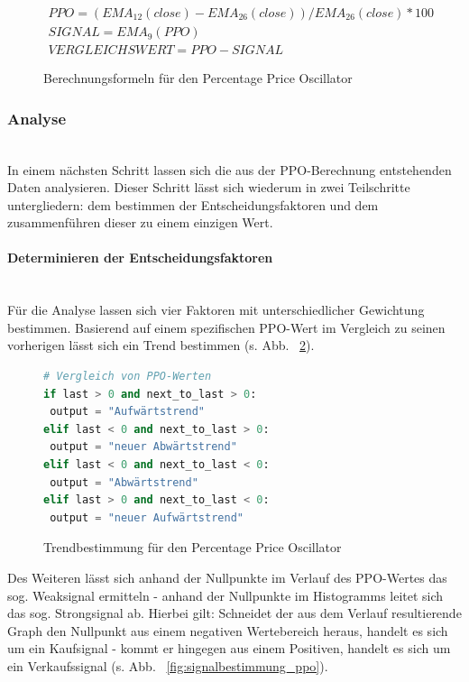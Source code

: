 \begin{figure}[!ht]
\begin{gather*} 
PPO = ( EMA_{12}(close) - EMA_{26}(close) ) / EMA_{26}(close) * 100 \\ 
SIGNAL =  EMA_9( PPO )\\
VERGLEICHSWERT = PPO - SIGNAL
\end{gather*}
\caption{Berechnungsformeln für den Percentage Price Oscillator \cite{tvWikiPpo}}
\label{fig:formular_ppo}
\end{figure}

\subsubsection{Analyse}~\\
\label{subsec_analysis_ppo}
In einem nächsten Schritt lassen sich die aus der PPO-Berechnung entstehenden Daten analysieren. Dieser Schritt lässt sich wiederum in zwei Teilschritte untergliedern: dem bestimmen der Entscheidungsfaktoren und dem zusammenführen dieser zu einem einzigen Wert.

\paragraph{Determinieren der Entscheidungsfaktoren}~\\
\label{subsubsec_analysis_calc_ppo}
Für die Analyse lassen sich vier Faktoren mit unterschiedlicher Gewichtung bestimmen. Basierend auf einem spezifischen PPO-Wert im Vergleich zu seinen vorherigen lässt sich ein Trend bestimmen (s. Abb. ~\ref{fig:trendbestimmung_ppo}).

\begin{figure}[!ht]
\begin{lstlisting}[language=Python]
# Vergleich von PPO-Werten
if last > 0 and next_to_last > 0:
 output = "Aufwärtstrend"
elif last < 0 and next_to_last > 0:
 output = "neuer Abwärtstrend"
elif last < 0 and next_to_last < 0:
 output = "Abwärtstrend"
elif last > 0 and next_to_last < 0:
 output = "neuer Aufwärtstrend"
\end{lstlisting}
\caption{Trendbestimmung für den Percentage Price Oscillator}
\label{fig:trendbestimmung_ppo}
\end{figure}

Des Weiteren lässt sich anhand der Nullpunkte im Verlauf des PPO-Wertes das sog. Weaksignal ermitteln - anhand der Nullpunkte im Histogramms leitet sich das sog. Strongsignal ab. Hierbei gilt: Schneidet der aus dem Verlauf resultierende Graph den Nullpunkt aus einem negativen Wertebereich heraus, handelt es sich um ein Kaufsignal - kommt er hingegen aus einem Positiven, handelt es sich um ein Verkaufssignal (s. Abb. ~\ref{fig:signalbestimmung_ppo}). 

